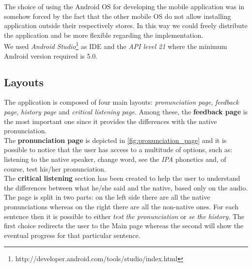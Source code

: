 The choice of using the Android OS for developing the mobile application was in somehow forced by the fact that the other mobile OS do not allow installing application outside their respectively stores. In this way we could freely distribute the application and be more flexible regarding the implementation. \\
\noindent We used \textit{Android Studio}\footnote{http://developer.android.com/tools/studio/index.html} as IDE and the \textit{API level 21} where the minimum  Android version required is 5.0.

\subsection{Layouts}
\label{ssec:layouts}
The application is composed of four main layouts: \textit{pronunciation page}, \textit{feedback page}, \textit{history page} and \textit{critical listening page}. Among these, the \textbf{feedback page} is the most important one since it provides the differences with the native pronunciation. \\

\noindent The \textbf{pronunciation page} is depicted in \ref{fig:pronunciation_page} and it is possible to notice that the user has access to a multitude of options, such as: listening to the native speaker, change word, see the \textit{IPA} phonetics and, of course, test his/her pronunciation. \\

\noindent The \textbf{critical listening} section has been created to help the user to understand the differences between what he/she said and the native, based only on the audio. The page is split in two parts: on the left side there are all the native pronunciations whereas on the right there are all the non-native ones. For each sentence then it is possible to either \textit{test the pronunciation} or \textit{se the history}. The first choice redirects the user to the Main page whereas the second will show the eventual progress for that particular sentence. \\

